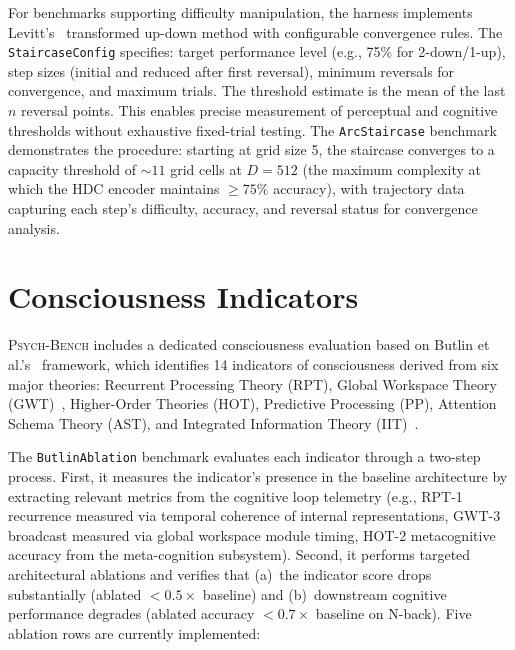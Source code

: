 \documentclass[11pt,letterpaper]{article}
\newcommand{\psychbench}{\textsc{Psych-Bench}}
\begin{document}
For benchmarks supporting difficulty manipulation, the harness implements Levitt's~\citep{levitt1971transformed} transformed up-down method with configurable convergence rules. The \texttt{StaircaseConfig} specifies: target performance level (e.g., 75\% for 2-down/1-up), step sizes (initial and reduced after first reversal), minimum reversals for convergence, and maximum trials. The threshold estimate is the mean of the last $n$ reversal points. This enables precise measurement of perceptual and cognitive thresholds without exhaustive fixed-trial testing. The \texttt{ArcStaircase} benchmark demonstrates the procedure: starting at grid size 5, the staircase converges to a capacity threshold of ${\sim}11$ grid cells at $D = 512$ (the maximum complexity at which the HDC encoder maintains ${\geq}75\%$ accuracy), with trajectory data capturing each step's difficulty, accuracy, and reversal status for convergence analysis.

\section{Consciousness Indicators}
\label{sec:consciousness}

\psychbench{} includes a dedicated consciousness evaluation based on Butlin et al.'s~\citep{butlin2023consciousness} framework, which identifies 14 indicators of consciousness derived from six major theories: Recurrent Processing Theory (RPT), Global Workspace Theory (GWT)~\citep{baars1988cognitive}, Higher-Order Theories (HOT), Predictive Processing (PP), Attention Schema Theory (AST), and Integrated Information Theory (IIT)~\citep{tononi2004information,oizumi2014phenomenology}.

The \texttt{ButlinAblation} benchmark evaluates each indicator through a two-step process. First, it measures the indicator's presence in the baseline architecture by extracting relevant metrics from the cognitive loop telemetry (e.g., RPT-1 recurrence measured via temporal coherence of internal representations, GWT-3 broadcast measured via global workspace module timing, HOT-2 metacognitive accuracy from the meta-cognition subsystem). Second, it performs targeted architectural ablations and verifies that (a)~the indicator score drops substantially (ablated $< 0.5 \times$ baseline) and (b)~downstream cognitive performance degrades (ablated accuracy $< 0.7 \times$ baseline on N-back). Five ablation rows are currently implemented:
\end{document}

